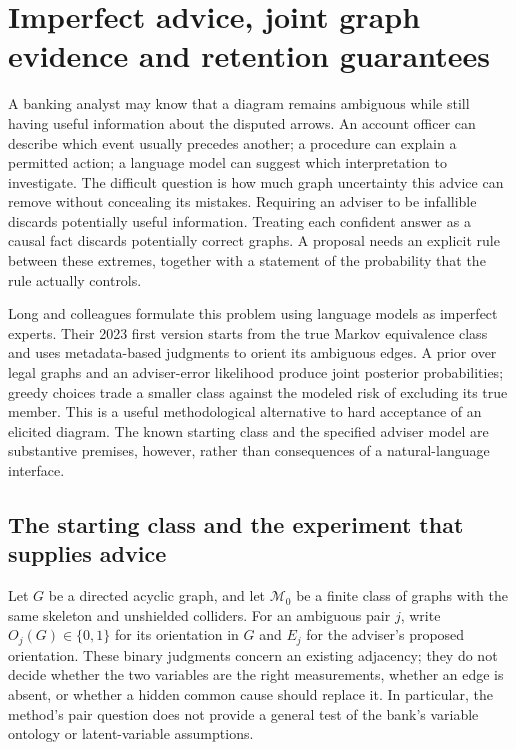 \section{Imperfect advice, joint graph evidence and retention guarantees}
\label{exec17:advice-development}

A banking analyst may know that a diagram remains ambiguous while still
having useful information about the disputed arrows. An account officer can
describe which event usually precedes another; a procedure can explain a
permitted action; a language model can suggest which interpretation to
investigate. The difficult question is how much graph uncertainty this advice
can remove without concealing its mistakes. Requiring an adviser to be
infallible discards potentially useful information. Treating each confident
answer as a causal fact discards potentially correct graphs. A proposal needs
an explicit rule between these extremes, together with a statement of the
probability that the rule actually controls.

Long and colleagues formulate this problem using language models as imperfect
experts. Their 2023 first version starts from the true Markov equivalence class
and uses metadata-based judgments to orient its ambiguous edges. A prior over
legal graphs and an adviser-error likelihood produce joint posterior
probabilities; greedy choices trade a smaller class against the modeled risk
of excluding its true member. This is a useful methodological alternative to
hard acceptance of an elicited diagram. The known starting class and the
specified adviser model are substantive premises, however, rather than
consequences of a natural-language interface.~\citep{exec17_imperfect_experts}

\subsection{The starting class and the experiment that supplies advice}

Let $G$ be a directed acyclic graph, and let $\mathcal M_0$ be a finite class of
graphs with the same skeleton and unshielded colliders. For an ambiguous pair
$j$, write $O_j(G)\in\{0,1\}$ for its orientation in $G$ and $E_j$ for the
adviser's proposed orientation. These binary judgments concern an existing
adjacency; they do not decide whether the two variables are the right
measurements, whether an edge is absent, or whether a hidden common cause
should replace it. In particular, the method's pair question does not provide
a general test of the bank's variable ontology or latent-variable assumptions.

